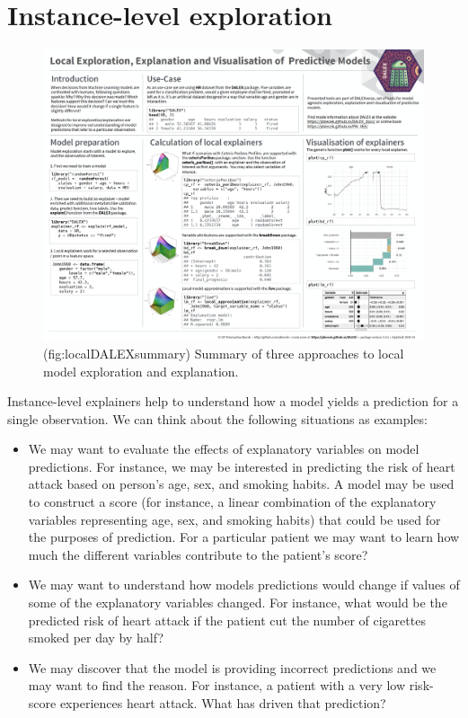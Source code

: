 \documentclass[12pt,]{krantz}
\providecommand{\tightlist}{%
  \setlength{\itemsep}{0pt}\setlength{\parskip}{0pt}}
\theoremstyle{definition}
\theoremstyle{definition}
\theoremstyle{definition}
\theoremstyle{remark}
\begin{document}
\hypertarget{InstanceLevelExploration}{%
\section{Instance-level exploration}\label{InstanceLevelExploration}}

\begin{figure}

{\centering \includegraphics[width=0.99\linewidth]{figure/DALEX_local} 

}

\caption{(fig:localDALEXsummary) Summary of three approaches to local model exploration and explanation.}\label{fig:localDALEXsummary}
\end{figure}

Instance-level explainers help to understand how a model yields a
prediction for a single observation. We can think about the following
situations as examples:

\begin{itemize}
\tightlist
\item
  We may want to evaluate the effects of explanatory variables on model
  predictions. For instance, we may be interested in predicting the risk
  of heart attack based on person's age, sex, and smoking habits. A
  model may be used to construct a score (for instance, a linear
  combination of the explanatory variables representing age, sex, and
  smoking habits) that could be used for the purposes of prediction. For
  a particular patient we may want to learn how much the different
  variables contribute to the patient's score?
\item
  We may want to understand how models predictions would change if
  values of some of the explanatory variables changed. For instance,
  what would be the predicted risk of heart attack if the patient cut
  the number of cigarettes smoked per day by half?
\item
  We may discover that the model is providing incorrect predictions and
  we may want to find the reason. For instance, a patient with a very
  low risk-score experiences heart attack. What has driven that
  prediction?
\end{itemize}
\end{document}
